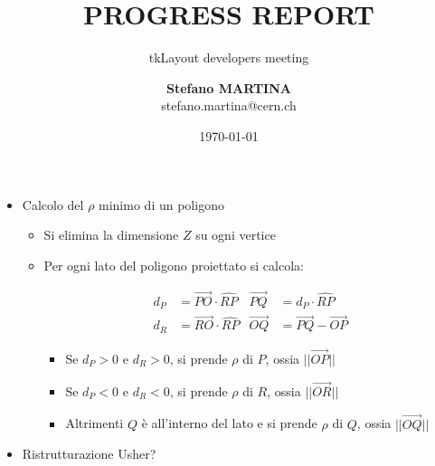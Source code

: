 \documentclass[pdftex, 11pt]{beamer}
\title[Progress report]{\textbf{PROGRESS REPORT}}
\subtitle{tkLayout developers meeting}
\institute[CERN]{
  European Organization for Nuclear Research\\[0.5cm]
  \texttt{[image: img/LogoBadge.pdf]}\\
}
\author[Stefano Martina]{
  \textbf{Stefano MARTINA}\\
  {\small stefano.martina@cern.ch}
}
\date[\today]{\flushright \today}
\begin{document}
\begin{frame}
  \titlepage
\end{frame}

\begin{frame}
  \begin{itemize}
  \item Calcolo del \alert{$\rho$ minimo} di un poligono
    \begin{itemize}
    \item Si \alert{elimina} la dimensione \alert{$Z$} su ogni vertice
    \item Per \alert{ogni lato} del poligono proiettato si calcola:\\
      \begin{center}
      \end{center}
      \begin{align*}
        d_P &= \overrightarrow{PO} \cdot \hat{RP}&\overrightarrow{PQ} &= d_P \cdot \hat{RP}\\
        d_R &= \overrightarrow{RO} \cdot \hat{RP}&\overrightarrow{OQ} &= \overrightarrow{PQ} - \overrightarrow{OP}
      \end{align*}
      \begin{itemize}
      \item Se \alert{$d_P > 0$} e \alert{$d_R > 0$}, si prende $\rho$
        di $P$, ossia \alert{$||\overrightarrow{OP}||$}
      \item Se \alert{$d_P < 0$} e \alert{$d_R < 0$}, si prende $\rho$
        di $R$, ossia \alert{$||\overrightarrow{OR}||$}
      \item \alert{Altrimenti} $Q$ \`e all'interno del lato e si
        prende $\rho$ di $Q$, ossia \alert{$||\overrightarrow{OQ}||$}
      \end{itemize}
    \end{itemize}
  \item Ristrutturazione \alert{Usher}?
  \end{itemize}
\end{frame}
\end{document}
